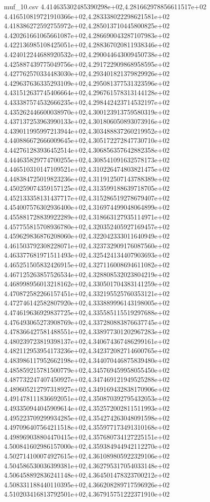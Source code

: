 \begin{filecontents*}{muf_10.csv}
4.414635302485390298e+02,4.281662978856611517e+02
4.416510819721910366e+02,4.283338022298621581e+02
4.418386272592755972e+02,4.285013710445800825e+02
4.420261661065661087e+02,4.286690043287107983e+02
4.422136985108425051e+02,4.288367020811938346e+02
4.424012244688920532e+02,4.290044643009450738e+02
4.425887439775049756e+02,4.291722909868958595e+02
4.427762570334483030e+02,4.293401821379829926e+02
4.429637636335293109e+02,4.295081377531323596e+02
4.431512637745406664e+02,4.296761578313144128e+02
4.433387574532666235e+02,4.298442423714532197e+02
4.435262446600038970e+02,4.300123913759580319e+02
4.437137253963990133e+02,4.301806050893073916e+02
4.439011995997213944e+02,4.303488837260219952e+02
4.440886672666009645e+02,4.305172272847730710e+02
4.442761283936452514e+02,4.306856357642882358e+02
4.444635829774700255e+02,4.308541091632578173e+02
4.446510310147109521e+02,4.310226474803821475e+02
4.448384725019823236e+02,4.311912507143788389e+02
4.450259074359157125e+02,4.313599188639718705e+02
4.452133358131437717e+02,4.315286519278679407e+02
4.454007576302936400e+02,4.316974499048064899e+02
4.455881728839922289e+02,4.318663127935114971e+02
4.457755815708936780e+02,4.320352405927169457e+02
4.459629836876208060e+02,4.322042333011640949e+02
4.461503792308228071e+02,4.323732909176087560e+02
4.463377681971511493e+02,4.325424134407903693e+02
4.465251505832426915e+02,4.327116008694611082e+02
4.467125263857526534e+02,4.328808532023804219e+02
4.468998956013218162e+02,4.330501704383141259e+02
4.470872582266157451e+02,4.332195525760353121e+02
4.472746142582807920e+02,4.333889996143198005e+02
4.474619636929837725e+02,4.335585115519297688e+02
4.476493065273908769e+02,4.337280883876637745e+02
4.478366427581488551e+02,4.338977301202967283e+02
4.480239723819398137e+02,4.340674367486299161e+02
4.482112953954173236e+02,4.342372082714600765e+02
4.483986117952662198e+02,4.344070446875839480e+02
4.485859215781500779e+02,4.345769459958055450e+02
4.487732247407450927e+02,4.347469121949525288e+02
4.489605212797318927e+02,4.349169432838170906e+02
4.491478111836692051e+02,4.350870392795432053e+02
4.493350944045909614e+02,4.352572002811511993e+02
4.495223709299934285e+02,4.354274263048091598e+02
4.497096407564211518e+02,4.355977173491310168e+02
4.498969038804470415e+02,4.357680734127225151e+02
4.500841602986157000e+02,4.359384944942112270e+02
4.502714100074927615e+02,4.361089805922329106e+02
4.504586530036399381e+02,4.362795317054033148e+02
4.506458892836241148e+02,4.364501478323700212e+02
4.508331188440110395e+02,4.366208289717596926e+02
4.510203416813792501e+02,4.367915751222371910e+02

\end{filecontents*}
